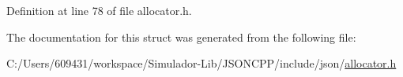 Definition at line 78 of file allocator.\+h.



The documentation for this struct was generated from the following file\+:\begin{DoxyCompactItemize}
\item 
C\+:/\+Users/609431/workspace/\+Simulador-\/\+Lib/\+J\+S\+O\+N\+C\+P\+P/include/json/\hyperlink{allocator_8h}{allocator.\+h}\end{DoxyCompactItemize}
